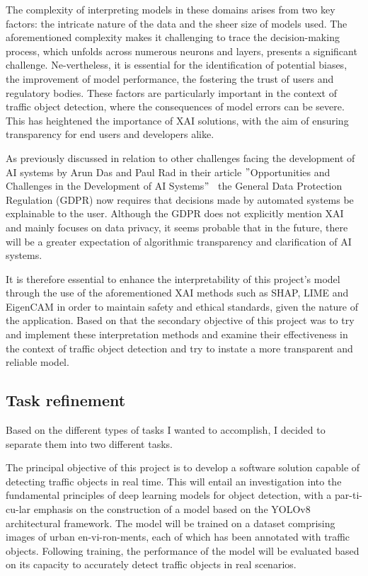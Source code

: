 The complexity of interpreting models in these domains arises from two key factors: the intricate nature of the data and the sheer size of models used.
The aforementioned complexity makes it challenging to trace the decision-making process, which unfolds across numerous neurons and layers,
presents a significant challenge.
Ne-vertheless, it is essential for the identification of potential biases, the improvement of model performance, the fostering the trust of users and regulatory bodies.
These factors are particularly important in the context of traffic object detection, where the consequences of model errors can be severe.
This has heightened the importance of XAI solutions, with the aim of ensuring transparency for end users and developers alike.

As previously discussed in relation to other challenges facing the development of AI systems by Arun Das and Paul Rad in their article
\("\)Opportunities and Challenges in the Development of AI Systems\("\)~\cite{das2020opportunitieschallengesexplainableartificial}
the General Data Protection Regulation (GDPR) now requires that decisions made by automated systems be
explainable to the user.
Although the GDPR does not explicitly mention XAI and mainly focuses on data privacy,
it seems probable that in the future, there will be a greater expectation of algorithmic transparency and clarification of AI systems.

It is therefore essential to enhance the interpretability of this project's model through the use of the aforementioned
XAI methods such as SHAP, LIME and EigenCAM in order to maintain safety and ethical standards, given the nature of the
application.
Based on that the secondary objective of this project was to try and implement these interpretation methods and examine their
effectiveness in the context of traffic object detection and try to instate a more transparent and reliable model.

\subsection{Task refinement}\label{subsec:Refinement-of-the-task} %

Based on the different types of tasks I wanted to accomplish, I decided to separate them into two different tasks.

The principal objective of this project is to develop a software solution capable of detecting traffic objects in real time.
This will entail an investigation into the fundamental principles of deep learning models for object detection, with a
par-ti-cu-lar emphasis on the construction of a model based on the YOLOv8 architectural framework.
The model will be trained on a dataset comprising images of urban en-vi-ron-ments, each of which has been annotated with
traffic objects.
Following training, the performance of the model will be evaluated based on its capacity to accurately detect traffic objects
in real scenarios.

